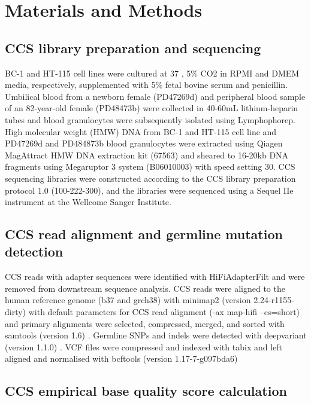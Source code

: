 \section{Materials and Methods}

\subsection{CCS library preparation and sequencing}


BC-1 and HT-115 cell lines were cultured at 37 \textcelsius, 5\% CO2 in RPMI and DMEM media, respectively, supplemented with 5\% fetal bovine serum and penicillin. Umbilical blood from a newborn female (PD47269d) and peripheral blood sample of an 82-year-old female (PD48473b) were collected in 40-60mL lithium-heparin tubes and blood granulocytes were subsequently isolated using Lymphophorep. High molecular weight (HMW) DNA from BC-1 and HT-115 cell line and PD47269d and PD484873b blood granulocytes were extracted using Qiagen MagAttract HMW DNA extraction kit (67563) and sheared to 16-20kb DNA fragments using Megaruptor 3 system (B06010003) with speed setting 30. CCS sequencing libraries were constructed according to the CCS library preparation protocol 1.0 (100-222-300), and the libraries were sequenced using a Sequel IIe instrument at the Wellcome Sanger Institute. 


\subsection{CCS read alignment and germline mutation detection}
CCS reads with adapter sequences were identified with HiFiAdapterFilt \cite{Sim2022-pi} and were removed from downstream sequence analysis. CCS reads were aligned to the human reference genome (b37 and grch38) with minimap2 (version 2.24-r1155-dirty) with default parameters for CCS read alignment (-ax map-hifi --cs=short) \cite{Li2018-am} and primary alignments were selected, compressed, merged, and sorted with samtools (version 1.6) \cite{Li2009-qp}. Germline SNPs and indels were detected with deepvariant (version 1.1.0) \cite{Poplin2018-ub}. VCF files were compressed and indexed with tabix \cite{Li2011-zj} and left aligned and normalised with bcftools (version 1.17-7-g097bda6) \cite{Li2011-ag}


\subsection{CCS empirical base quality score calculation}

